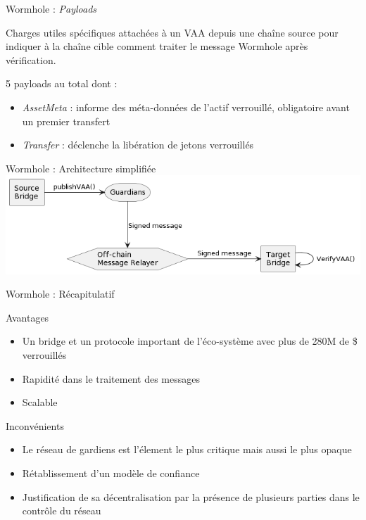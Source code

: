 \begin{frame}{Wormhole : \textit{Payloads}}
    
    Charges utiles spécifiques attachées à un VAA depuis une chaîne source pour indiquer à la chaîne cible comment traiter le message Wormhole après vérification.\newline
    
    5 payloads au total dont :
    \begin{itemize}
        \item \textit{AssetMeta} : informe des méta-données de l'actif verrouillé, obligatoire avant un premier transfert
        \item \textit{Transfer} : déclenche la libération de jetons verrouillés
    \end{itemize}
\end{frame}
    
\begin{frame}{Wormhole : Architecture simplifiée}
    \centering
    \includegraphics[scale = 0.5]{centralisation/wormhole_louis.png}
\end{frame}
    
\begin{frame}{Wormhole : Récapitulatif}
    \begin{block}{Avantages}
        \begin{itemize}
            \item Un bridge et un protocole important de l'éco-système avec plus de 280M de \$ verrouillés
            \item Rapidité dans le traitement des messages
            \item Scalable

        \end{itemize}
    \end{block}

    \begin{block}{Inconvénients}
        \begin{itemize}
            \item Le réseau de gardiens est l'élement le plus critique mais aussi le plus opaque
            \item Rétablissement d'un modèle de confiance
            \item Justification de sa décentralisation par la présence de plusieurs parties dans le contrôle du réseau
        \end{itemize}
    \end{block}
\end{frame}




